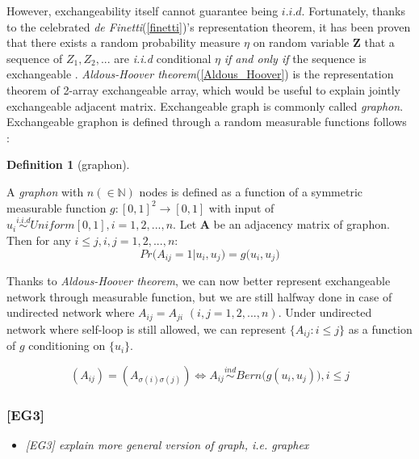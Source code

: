 \documentclass[12pt]{article}
\theoremstyle{definition}
\newtheorem{definition}{Definition}[section]
\begin{document}
However, exchangeability itself cannot guarantee being $i.i.d$. Fortunately, thanks to the celebrated  \textit{de Finetti}(\ref{finetti})'s representation theorem, it has been proven that there exists a random probability measure $\eta$ on random variable $\mathbf{Z}$ that a sequence of $Z_{1}, Z_{2}, ... $ are \textit{i.i.d} conditional $\eta$ \textit{if and only if} the sequence is exchangeable \cite{Orbanz} \cite{Caron}. \textit{Aldous-Hoover theorem}(\ref{Aldous_Hoover}) is the representation theorem of 2-array exchangeable array, which would be useful to explain jointly exchangeable adjacent matrix. Exchangeable graph is commonly called \textit{graphon}. Exchangeable graphon is defined through a random measurable functions follows \cite{Chan}:

\begin{definition}[graphon]
	\label{graphon}
	
	A \textit{graphon} with $n (\in \mathbb{N})$ nodes is defined as a function of a symmetric measurable function $g : [0,1]^2 \rightarrow [0,1]$ with input of $u_{i} \overset{i.i.d}{\sim} Uniform[0,1], i = 1,2,... ,n$. 
	Let $\mathbf{A}$ be an adjacency matrix of graphon. Then for any $i \leq j, i,j=1,2,...,n$:	
	\begin{equation}
	Pr \big(   A_{ij} = 1 \big| u_{i}, u_{j} \big) = g \big(  u_{i}, u_{j} \big)
	\end{equation}
	
\end{definition}

Thanks to \textit{Aldous-Hoover theorem}, we can now better represent exchangeable network through measurable function, but we are still halfway done in case of undirected network where $A_{ij} = A_{ji}$  $(i,j=1,2,... , n)$.  Under undirected network where self-loop is still allowed, we can represent $\{ A_{ij} : i \leq j \}$ as a function of $g$ conditioning on $\{ u_{i}\}$. 



\begin{equation}
( A_{ij} )  =  (   A_{\sigma(i) \sigma(j)}  ) \Longleftrightarrow A_{ij} \overset{ind}{\sim} Bern\big(  g(u_{i}, u_{j}) \big), i \leq j
\end{equation}  


\subsubsection{[EG3]}
\begin{itemize}
	\item {\it  [EG3] explain more general version of graph, i.e. graphex \/}
\end{itemize}
\end{document}
